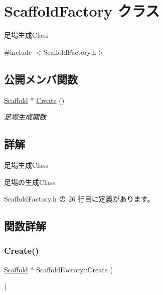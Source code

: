 \hypertarget{class_scaffold_factory}{}\section{Scaffold\+Factory クラス}
\label{class_scaffold_factory}


足場生成\+Class  




{\ttfamily \#include $<$Scaffold\+Factory.\+h$>$}

\subsection*{公開メンバ関数}
\begin{DoxyCompactItemize}
\item 
\mbox{\hyperlink{class_scaffold}{Scaffold}} $\ast$ \mbox{\hyperlink{class_scaffold_factory_abc0219587730fb1f650d465444363f82}{Create}} ()
\begin{DoxyCompactList}\small\item\em 足場生成関数 \end{DoxyCompactList}\end{DoxyCompactItemize}


\subsection{詳解}
足場生成\+Class 

足場の生成\+Class 

 Scaffold\+Factory.\+h の 26 行目に定義があります。



\subsection{関数詳解}
\mbox{\label{class_scaffold_factory_abc0219587730fb1f650d465444363f82}} 
\subsubsection{\texorpdfstring{Create()}{Create()}}
{\footnotesize\ttfamily \mbox{\hyperlink{class_scaffold}{Scaffold}} $\ast$ Scaffold\+Factory\+::\+Create (\begin{DoxyParamCaption}{ }\end{DoxyParamCaption})}



